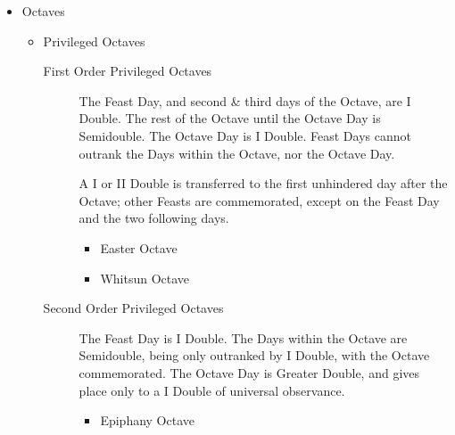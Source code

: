\begin{itemize}
    \item Octaves
        \begin{itemize}
            \item Privileged Octaves
                \begin{description}
                    \item[First Order Privileged Octaves] The Feast Day, and second \& third days of the Octave, are I Double. The rest of the Octave until the Octave Day is Semidouble. The Octave Day is I Double. Feast Days cannot outrank the Days within the Octave, nor the Octave Day.\par
                    A I or II Double is transferred to the first unhindered day after the Octave; other Feasts are commemorated, except on the Feast Day and the two following days.
                        \begin{itemize}
                            \item Easter Octave
                            \item Whitsun Octave
                        \end{itemize}
                    \item[Second Order Privileged Octaves] The Feast Day is I Double. The Days within the Octave are Semidouble, being only outranked by I Double, with the Octave commemorated. The Octave Day is Greater Double, and gives place only to a I Double of universal observance.
                        \begin{itemize}
                            \item Epiphany Octave

\end{itemize}
\end{description}
\end{itemize}
\end{itemize}
